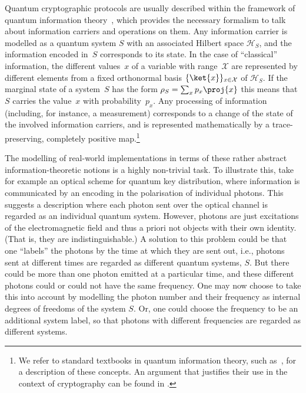 Quantum cryptographic protocols are usually described within the framework of quantum information theory~\cite{nielsen2010quantum}, which provides the necessary formalism to talk about information carriers and operations on them. Any information carrier is modelled as a quantum system $S$ with an associated Hilbert space $\mathcal{H}_S$, and the information encoded in~$S$ corresponds to its state. In the case of ``classical'' information,  the different values~$x$ of a variable with range~$\mathcal{X}$ are represented by different elements from a fixed orthonormal basis  $\{\ket{x}\}_{x \in \mathcal{X}}$ of $\mathcal{H}_S$. If the marginal state of  a system~$S$ has the form  $\rho_{S} = \sum_{x} p_{x} \proj{x}$  this means that $S$ carries the value~$x$ with probability~$p_x$. 
Any processing of information (including, for instance, a measurement)  corresponds to a change of the state of the involved information carriers, and is represented mathematically by a  trace-preserving, completely positive map.\footnote{We refer to standard textbooks in quantum information theory, such as~\textcite{nielsen2010quantum}, for a description of these concepts. An argument that justifies their use in the context of cryptography can be found in \textcite{RenesRenner2020}.}

The modelling of real-world implementations in terms of these rather abstract information-theoretic notions is a highly non-trivial task. To illustrate this, take for example an optical scheme for quantum key distribution, where information is communicated by an encoding in the polarisation of individual photons. This suggests a description where each photon sent over the optical channel is regarded as an individual quantum system. However, photons are just excitations of the electromagnetic field and thus a priori not objects with their own identity. (That is, they are indistinguishable.) A solution to this problem could be that one ``labels'' the photons by the time at which they are sent out, i.e., photons sent at  different times are regarded as different quantum systems, $S$. But there could be more than one photon emitted at a particular time, and these different photons could or could not have the same frequency. One may now choose to take this into account by modelling the photon number and their frequency as internal degrees of freedoms of the system $S$. Or, one could choose the frequency to be an additional system label, so that photons with different frequencies are regarded as different systems. 


